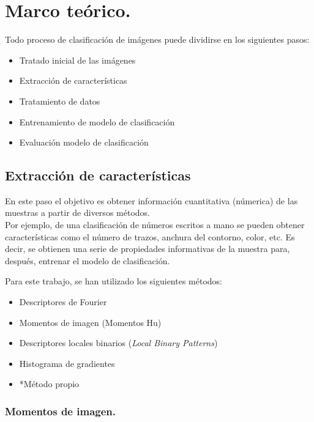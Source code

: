 \chapter{Marco teórico.}


Todo proceso de clasificación de imágenes puede dividirse en los siguientes pasos:

\begin{itemize}
	\item Tratado inicial de las imágenes
	\item Extracción de características
	\item Tratamiento de datos
	\item Entrenamiento de modelo de clasificación
	\item Evaluación modelo de clasificación
\end{itemize}

\section{Extracción de características}
\label{section:Extracción de catacterísticas}

En este paso el objetivo es obtener información cuantitativa (númerica) de las muestras a partir de diversos métodos.\\ Por ejemplo, de una clasificación de números escritos a mano se pueden obtener características como el número de trazos, anchura del contorno, color, etc. Es decir, se obtienen una serie de propiedades informativas de la muestra para, después, entrenar el modelo de clasificación. 

Para este trabajo, se han utilizado los siguientes métodos:
\begin{itemize}
	\item Descriptores de Fourier
	\item Momentos de imagen (Momentos Hu)
	\item Descriptores locales binarios (\textit{Local Binary Patterns})
	\item Histograma de gradientes
	\item *Método propio
\end{itemize}

\subsection{Momentos de imagen.}

